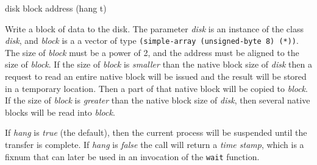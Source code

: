  {disk block address \key (hang t)}

Write a block of data to the disk.  The parameter \textit{disk} is an
instance of the class \textit{disk}, and \textit{block} is a a vector
of type \texttt{(simple-array (unsigned-byte 8) (*))}.  The size of
\textit{block} must be a power of 2, and the address must be aligned
to the size of \textit{block}.  If the size of \textit{block} is
\emph{smaller} than the native block size of \textit{disk} then a
request to read an entire native block will be issued and the result
will be stored in a temporary location.  Then a part of that native
block will be copied to \textit{block}.  If the size of \textit{block}
is \emph{greater} than the native block size of \textit{disk}, then
several native blocks will be read into \textit{block}.

If \textit{hang} is \emph{true} (the default), then the current
process will be suspended until the transfer is complete.
If \textit{hang} is \emph{false} the call will return a \emph{time
  stamp}, which is a fixnum that can later be used in an invocation of
the \texttt{wait} function.
